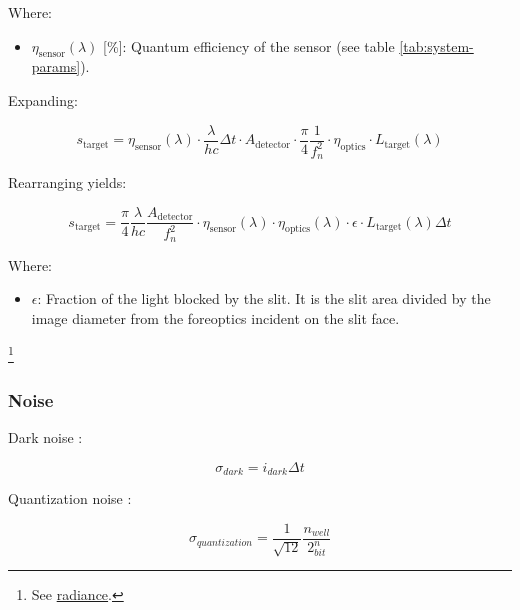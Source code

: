\documentclass{article}
\begin{document}
Where:
\begin{itemize}[label={}]
    \item $\eta_{\text{sensor}}(\lambda)$ [\si{\percent}]: Quantum efficiency of the sensor (see table \ref{tab:system-params}).
\end{itemize}

Expanding:


\begin{equation} 
    s_{\text{target}} = \eta_{\text{sensor}}(\lambda) \cdot \frac{\lambda}{hc} \Delta t \cdot A_{\text{detector}} \cdot \frac{\pi}{4}\frac{1}{f_n^2} \cdot \eta_{\text{optics}} \cdot L_{\text{target}}(\lambda) %
\end{equation}

Rearranging yields:

\begin{equation} 
    \boxed{s_{\text{target}} = \frac{\pi}{4} \frac{\lambda}{hc} \frac{A_{\text{detector}}}{f_n^2} \cdot \eta_{\text{sensor}}(\lambda) \cdot \eta_{\text{optics}}(\lambda) \cdot \epsilon \cdot L_{\text{target}}(\lambda) \Delta t } %
\end{equation}

Where:
\begin{itemize}[label={}]
    \item $\epsilon$: Fraction of the light blocked by the slit. It is the slit area divided by the image diameter from the foreoptics incident on the slit face.
\end{itemize}


\footnote{See \href{https://en.wikipedia.org/wiki/Radiance}{radiance}.}


\subsubsection{Noise} 

Dark noise \cite{noauthor_2019-yu}:

\begin{equation}
    \sigma_{dark} = i_{dark} \Delta t
\end{equation}

Quantization noise \cite{Fiete2001-kz, Wang2019-qd}:

\begin{equation}
    \sigma_{quantization} = \frac{1}{\sqrt{12}} \frac{n_{well}}{2^n_{bit}}
\end{equation}
\end{document}

